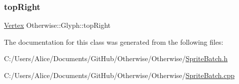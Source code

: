 \mbox{\label{class_otherwise_1_1_glyph_a77f5d16d67d30c9d48e44f3f9e4eefc8}} 
\subsubsection{\texorpdfstring{top\+Right}{topRight}}
{\footnotesize\ttfamily \hyperlink{struct_otherwise_1_1_vertex}{Vertex} Otherwise\+::\+Glyph\+::top\+Right}



The documentation for this class was generated from the following files\+:\begin{DoxyCompactItemize}
\item 
C\+:/\+Users/\+Alice/\+Documents/\+Git\+Hub/\+Otherwise/\+Otherwise/\hyperlink{_sprite_batch_8h}{Sprite\+Batch.\+h}\item 
C\+:/\+Users/\+Alice/\+Documents/\+Git\+Hub/\+Otherwise/\+Otherwise/\hyperlink{_sprite_batch_8cpp}{Sprite\+Batch.\+cpp}\end{DoxyCompactItemize}
